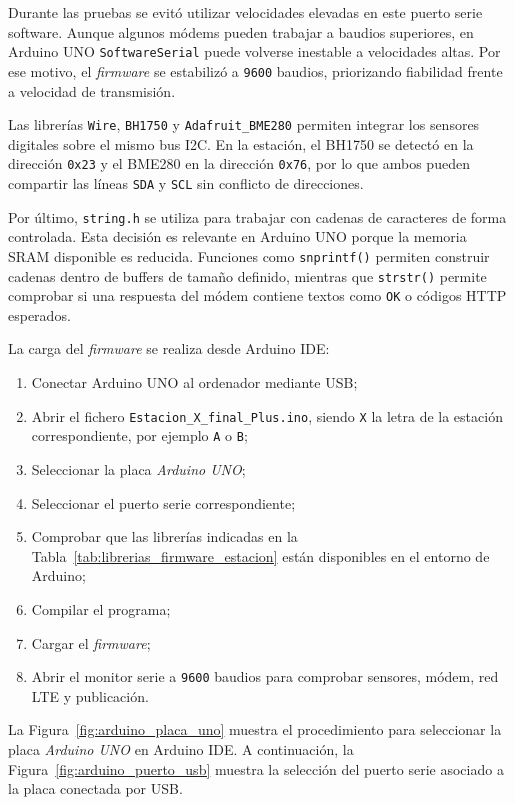 Durante las pruebas se evitó utilizar velocidades elevadas en este puerto serie software. Aunque algunos módems pueden trabajar a baudios superiores, en Arduino UNO \texttt{SoftwareSerial} puede volverse inestable a velocidades altas. Por ese motivo, el \textit{firmware} se estabilizó a \texttt{9600} baudios, priorizando fiabilidad frente a velocidad de transmisión.

Las librerías \texttt{Wire}, \texttt{BH1750} y \texttt{Adafruit\_BME280} permiten integrar los sensores digitales sobre el mismo bus I2C. En la estación, el BH1750 se detectó en la dirección \texttt{0x23} y el BME280 en la dirección \texttt{0x76}, por lo que ambos pueden compartir las líneas \texttt{SDA} y \texttt{SCL} sin conflicto de direcciones.

Por último, \texttt{string.h} se utiliza para trabajar con cadenas de caracteres de forma controlada. Esta decisión es relevante en Arduino UNO porque la memoria SRAM disponible es reducida. Funciones como \texttt{snprintf()} permiten construir cadenas dentro de buffers de tamaño definido, mientras que \texttt{strstr()} permite comprobar si una respuesta del módem contiene textos como \texttt{OK} o códigos HTTP esperados.

La carga del \textit{firmware} se realiza desde Arduino IDE:

\begin{enumerate}
    \item Conectar Arduino UNO al ordenador mediante USB;
    \item Abrir el fichero \texttt{Estacion\_X\_final\_Plus.ino}, siendo \texttt{X} la letra de la estación correspondiente, por ejemplo \texttt{A} o \texttt{B};
    \item Seleccionar la placa \textit{Arduino UNO};
    \item Seleccionar el puerto serie correspondiente;
    \item Comprobar que las librerías indicadas en la Tabla~\ref{tab:librerias_firmware_estacion} están disponibles en el entorno de Arduino;
    \item Compilar el programa;
    \item Cargar el \textit{firmware};
    \item Abrir el monitor serie a \texttt{9600} baudios para comprobar sensores, módem, red LTE y publicación.
\end{enumerate}

La Figura~\ref{fig:arduino_placa_uno} muestra el procedimiento para seleccionar la placa \textit{Arduino UNO} en Arduino IDE. A continuación, la Figura~\ref{fig:arduino_puerto_usb} muestra la selección del puerto serie asociado a la placa conectada por USB.

